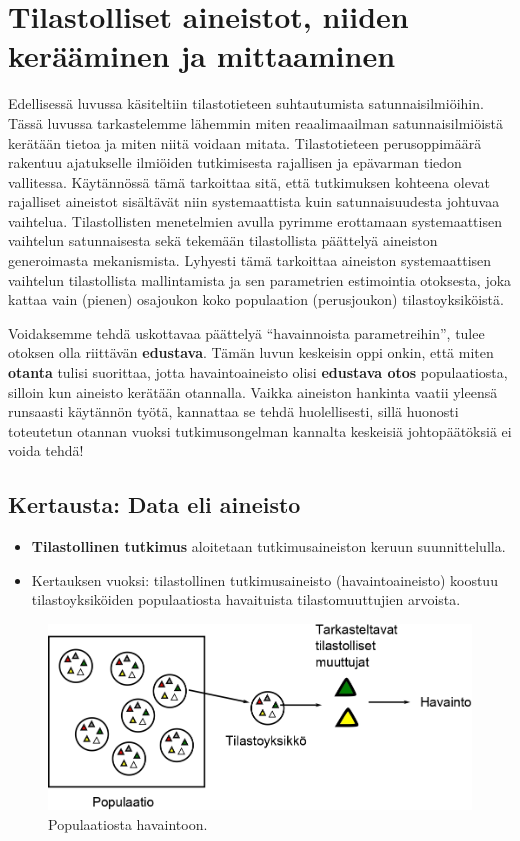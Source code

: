 \documentclass[
]{book}
\providecommand{\tightlist}{%
  \setlength{\itemsep}{0pt}\setlength{\parskip}{0pt}}
\begin{document}
\hypertarget{luku5}{%
\chapter{Tilastolliset aineistot, niiden kerääminen ja mittaaminen}\label{luku5}}

Edellisessä luvussa käsiteltiin tilastotieteen suhtautumista satunnaisilmiöihin. Tässä luvussa tarkastelemme lähemmin miten reaalimaailman satunnaisilmiöistä kerätään tietoa ja miten niitä voidaan mitata. Tilastotieteen perusoppimäärä rakentuu ajatukselle ilmiöiden tutkimisesta rajallisen ja epävarman tiedon vallitessa. Käytännössä tämä tarkoittaa sitä, että tutkimuksen kohteena olevat rajalliset aineistot sisältävät niin systemaattista kuin satunnaisuudesta johtuvaa vaihtelua. Tilastollisten menetelmien avulla pyrimme erottamaan systemaattisen vaihtelun satunnaisesta sekä tekemään tilastollista päättelyä aineiston generoimasta mekanismista. Lyhyesti tämä tarkoittaa aineiston systemaattisen vaihtelun tilastollista mallintamista ja sen parametrien estimointia otoksesta, joka kattaa vain (pienen) osajoukon koko populaation (perusjoukon) tilastoyksiköistä.

Voidaksemme tehdä uskottavaa päättelyä ``havainnoista parametreihin'', tulee otoksen olla riittävän \textbf{edustava}. Tämän luvun keskeisin oppi onkin, että miten \textbf{otanta} tulisi suorittaa, jotta havaintoaineisto olisi \textbf{edustava otos} populaatiosta, silloin kun aineisto kerätään otannalla. Vaikka aineiston hankinta vaatii yleensä runsaasti käytännön työtä, kannattaa se tehdä huolellisesti, sillä huonosti toteutetun otannan vuoksi tutkimusongelman kannalta keskeisiä johtopäätöksiä ei voida tehdä!

\hypertarget{alaluku51}{%
\section{Kertausta: Data eli aineisto}\label{alaluku51}}

\begin{itemize}
\tightlist
\item
  \textbf{Tilastollinen tutkimus} aloitetaan tutkimusaineiston keruun suunnittelulla.
\item
  Kertauksen vuoksi: tilastollinen tutkimusaineisto (havaintoaineisto) koostuu tilastoyksiköiden populaatiosta havaituista tilastomuuttujien arvoista.
\end{itemize}

\begin{figure}
\includegraphics[width=0.9\linewidth]{images/populaatiostahavaintoon} \caption{Populaatiosta havaintoon.}\label{fig:pophav}
\end{figure}
\end{document}
